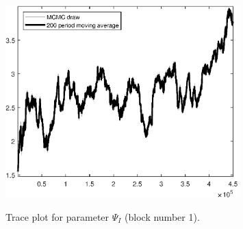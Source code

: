 \begin{figure}[H]
\centering
  \includegraphics[width=0.8\textwidth]{BRS_sectoral_wo_vcu/graphs/TracePlot_Psi_I_blck_1}\\
    \caption{Trace plot for parameter ${\Psi_I}$ (block number 1).}
\end{figure}
